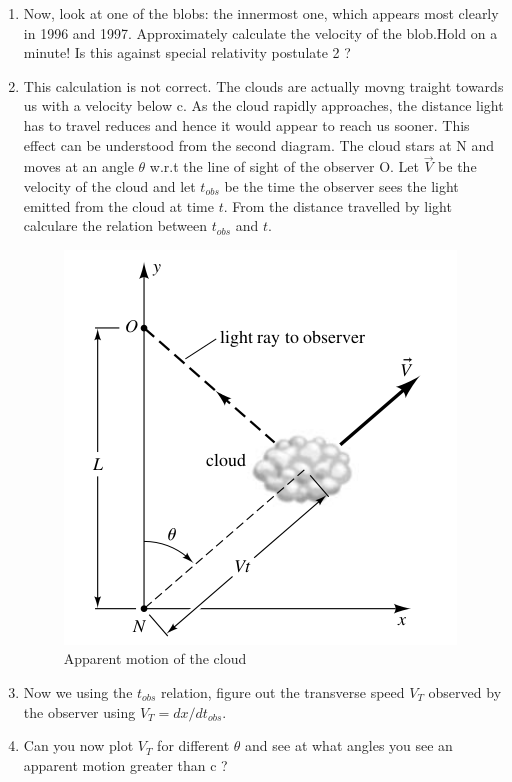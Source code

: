\documentclass[10pt,a4paper]{article}
\begin{document}
\begin{enumerate}
 \item Now, look at one of the blobs: the innermost one, which appears most clearly in 1996 and 1997. Approximately calculate the velocity of the blob.Hold on a minute! Is this against special relativity postulate 2 ?
 \item This calculation is not correct. The clouds are actually movng traight towards us with a velocity below c. As the cloud rapidly approaches, the distance light has to travel reduces and hence it would appear to reach us sooner. This effect can be understood from the second diagram. The cloud stars at N and moves at an angle $\theta$ w.r.t the line of sight of the observer O. Let $\vec{V}$ be the velocity of the cloud and let $t_{obs}$ be the time the observer sees the light emitted from the cloud at time $t$. From the distance travelled by light calculare the  relation between $t_{obs}$ and $t$.
 
\begin{figure}[htbp]
\centering
\includegraphics[scale=0.5]{superlum2.png} 
\caption{Apparent motion of the cloud}
\end{figure} 
 
\item Now we using the $t_{obs}$ relation, figure out the transverse speed $V_{T}$ observed by the observer using $V_{T} = dx/d t_{obs}$. 
\item Can you now plot $V_{T}$ for different $\theta$ and see at what angles you see an apparent motion greater than c ?
 
 
\end{enumerate}
\end{document}
